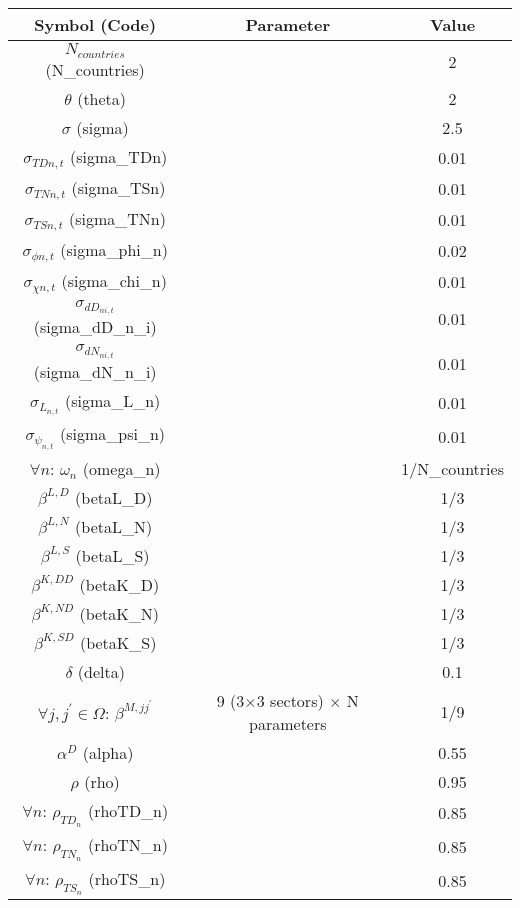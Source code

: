 \documentclass[12pt, bibtotoc, tablecaptionabove, figurecaptionabove, fleqn]{article}
\begin{document}
{\small
\begin{center}
	\begin{tabular}{ccc} 
		\hline
		\hline
		Symbol (Code) & Parameter & Value \\ 
		\hline
		$N_{countries}$ (N\_{countries}) & & 2 \\ 		
		$\theta$ (theta) & & 2 \\ 
		$\sigma$ (sigma) & & 2.5 \\
		$\sigma_{TDn,t}$ (sigma\_TDn) & & 0.01 \\
		$\sigma_{TNn,t}$ (sigma\_TSn) & & 0.01 \\
		$\sigma_{TSn,t}$ (sigma\_TNn) & & 0.01 \\
		$\sigma_{\phi n,t}$ (sigma\_phi\_n) & & 0.02 \\				$\sigma_{\chi n,t}$ (sigma\_chi\_n) & & 0.01 \\
                $\sigma_{dD_{ni,t}}$ (sigma\_dD\_n\_i) & & 0.01 \\
                $\sigma_{dN_{ni,t}}$ (sigma\_dN\_n\_i) & & 0.01 \\                
                $\sigma_{L_{n,t}}$ (sigma\_L\_n) & & 0.01 \\
                $\sigma_{\psi_{n,t}}$ (sigma\_psi\_n) & & 0.01 \\		                
		$\forall n$: $\omega_n$ (omega\_n) & & 1/N\_{countries}\\
		$\beta^{L,D}$ (betaL\_D) & & 1/3  \\
                $\beta^{L,N}$ (betaL\_N) & & 1/3 \\
                $\beta^{L,S}$ (betaL\_S) & & 1/3  \\                
		$\beta^{K,DD}$ (betaK\_D) & & 1/3\\
		$\beta^{K,ND}$ (betaK\_N) & & 1/3\\
		$\beta^{K,SD}$ (betaK\_S) & & 1/3\\		
		$\delta$ (delta) & & 0.1 \\
		$\forall j, j^{\prime} \in \Omega$: $\beta^{M, j j^{\prime}}$ & 9 (3$\times$3 sectors) $\times$ N parameters & 1/9\\
 		$\alpha^D$ (alpha) & & 0.55 \\ 
		$\rho$ (rho) & & 0.95 \\ 
		$\forall n$: $\rho_{TD_n}$ (rhoTD\_n) & & 0.85 \\ 
		$\forall n$: $\rho_{TN_n}$ (rhoTN\_n) & & 0.85 \\ 
		$\forall n$: $\rho_{TS_n}$ (rhoTS\_n) & & 0.85 \\ 		

\end{tabular}
\end{center}}
\end{document}
